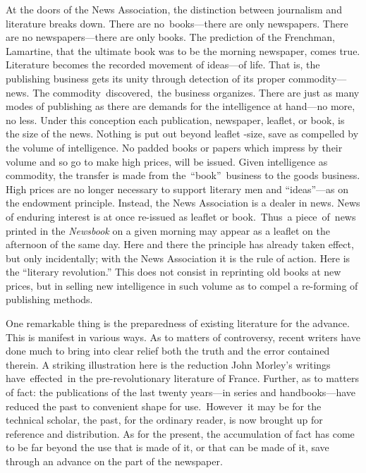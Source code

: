 \documentclass[twoside,symmetric,nobib,justified]{tufte-book}
\begin{document}
At the doors of the News Association, the distinction between journalism
and literature breaks down. There are no~books---there are only
newspapers. There are no newspapers---there are only books. The
prediction of the Frenchman, Lamartine, that the ultimate book was to be
the morning newspaper, comes true. Literature becomes the recorded
movement of ideas---of life. That is, the publishing business gets its
unity through detection of its proper commodity---news. The
commodity~discovered,~the business organizes. There are just as many
modes of publishing as there are demands for the intelligence at
hand---no more, no less. Under this conception each publication,
newspaper, leaflet, or book, is the size of the news. Nothing is put out
beyond leaflet -size, save as compelled by the volume of intelligence.
No padded books or papers which impress by their volume and so go to
make high prices, will be issued. Given intelligence as commodity, the
transfer is made from the~``book''~business to the goods business. High
prices are no longer necessary to support literary men and
``ideas''---as on the endowment principle. Instead, the News Association
is a dealer in news. News of enduring interest is at once re-issued as
leaflet or book.~Thus~a piece~of~news printed in the \emph{Newsbook} on
a given morning may appear as a leaflet on the afternoon of the same
day. Here and there the principle has already taken effect, but only
incidentally; with the News Association it is the rule of action. Here
is the ``literary revolution.'' This does not consist in reprinting old
books at new prices, but in selling new intelligence in such volume as
to compel a re-forming of publishing methods.~

One remarkable thing is the preparedness of existing literature for the
advance. This is manifest in various ways. As to matters of controversy,
recent writers have done much to bring into clear relief both the truth
and the error contained therein. A striking illustration here is the
reduction John Morley's writings have~effected~in the pre-revolutionary
literature of France. Further, as to matters of fact: the publications
of the last twenty years---in series and handbooks---have reduced the
past to convenient shape for use.~However~it may be for the technical
scholar, the past, for the ordinary reader, is now brought up for
reference and distribution. As for the present, the accumulation of fact
has come to be far beyond the use that is made of it, or that can be
made of it, save through an advance on the part of the newspaper.~
\end{document}
